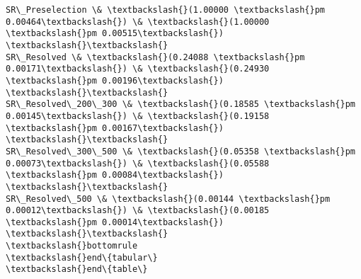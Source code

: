 \documentclass[11pt]{article}
\begin{document}
\begin{Verbatim}[commandchars=\\\{\}]
SR\_Preselection \& \textbackslash{}(1.00000 \textbackslash{}pm 0.00464\textbackslash{}) \& \textbackslash{}(1.00000 \textbackslash{}pm 0.00515\textbackslash{}) \textbackslash{}\textbackslash{}
SR\_Resolved \& \textbackslash{}(0.24088 \textbackslash{}pm 0.00171\textbackslash{}) \& \textbackslash{}(0.24930 \textbackslash{}pm 0.00196\textbackslash{}) \textbackslash{}\textbackslash{}
SR\_Resolved\_200\_300 \& \textbackslash{}(0.18585 \textbackslash{}pm 0.00145\textbackslash{}) \& \textbackslash{}(0.19158 \textbackslash{}pm 0.00167\textbackslash{}) \textbackslash{}\textbackslash{}
SR\_Resolved\_300\_500 \& \textbackslash{}(0.05358 \textbackslash{}pm 0.00073\textbackslash{}) \& \textbackslash{}(0.05588 \textbackslash{}pm 0.00084\textbackslash{}) \textbackslash{}\textbackslash{}
SR\_Resolved\_500 \& \textbackslash{}(0.00144 \textbackslash{}pm 0.00012\textbackslash{}) \& \textbackslash{}(0.00185 \textbackslash{}pm 0.00014\textbackslash{}) \textbackslash{}\textbackslash{}
\textbackslash{}bottomrule
\textbackslash{}end\{tabular\}
\textbackslash{}end\{table\}


    \end{Verbatim}


    
    
    
    
\end{document}
